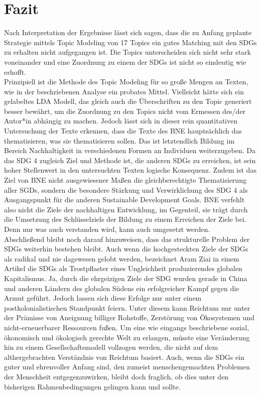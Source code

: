 \documentclass[letterpaper]{article}
\begin{document}
\section{Fazit}
Nach Interpretation der Ergebnisse lässt sich sagen, dass die zu Anfang geplante Strategie mittels Topic Modeling von 17 Topics ein gutes Matching mit den SDGs zu erhalten nicht aufgegangen ist. Die Topics unterscheiden sich nicht sehr stark voneinander und eine Zuordnung zu einem der SDGs ist nicht so eindeutig wie erhofft.\\
Prinzipiell ist die Methode des Topic Modeling für so große Mengen an Texten, wie in der beschriebenen Analyse ein probates Mittel. Vielleicht hätte sich ein gelabeltes LDA Modell, das gleich auch die Überschriften zu den Topic generiert besser bewährt, um die Zuordnung zu den Topics nicht vom Ermessen des/der Autor*in abhängig zu machen. Jedoch lässt sich in dieser rein quantitativen Untersuchung der Texte erkennen, dass die Texte des BNE hauptsächlich das thematisieren, was sie thematisieren sollen. Das ist letztendlich Bildung im Bereich Nachhaltigkeit in verschiedenen Formen an Individuen weiterzugeben. Da das SDG 4 zugleich Ziel und Methode ist, die anderen SDGs zu erreichen, ist sein hoher Stellenwert in den untersuchten Texten logische Konsequenz. Zudem ist das Ziel von BNE nicht ausgewiesener Maßen die gleichberechtigte Thematisierung aller SGDs, sondern die besondere Stärkung und Verwirklichung des SDG 4 als Ausgangspunkt für die anderen Sustainable Development Goals. BNE verfehlt also nicht die Ziele der nachhaltigen Entwicklung, im Gegenteil, sie trägt durch die Umsetzung des Schlüsselziels der Bildung zu einem Erreichen der Ziele bei. Denn nur was auch verstanden wird, kann auch umgesetzt werden.\\
Abschließend bleibt noch darauf hinzuweisen, dass das strukturelle Problem der SDGs weiterhin bestehen bleibt. Auch wenn die hochgesteckten Ziele der SDGs als radikal und nie dagewesen gelobt werden, bezeichnet Aram Ziai in einem Artikel die SDGs als \glqq Trostpflaster eines Ungleichheit produzierendes globalen Kapitalismus\grqq{}. Ja, durch die ehrgeizigen Ziele der SDG wurden gerade in China und anderen Ländern des globalen Südens ein erfolgreicher Kampf gegen die Armut geführt. Jedoch lassen sich diese Erfolge nur unter einem postkolonialistischen Standpunkt feiern. Unter diesem kann Reichtum nur unter der Prämisse von Aneignung billiger Rohstoffe, Zerstörung von Ökosystemen und nicht-erneuerbarer Ressourcen fußen. Um eine wie eingangs beschriebene sozial, ökonomisch und ökologisch gerechte Welt zu erlangen, müsste eine Veränderung hin zu einem Gesellschaftsmodell vollzogen werden, die nicht auf dem althergebrachten Verständnis von Reichtum basiert\cite{Ziai}. Auch, wenn die SDGs ein guter und ehrenvoller Anfang sind, den zumeist menschengemachten Problemen der Menschheit entgegenzuwirken, bleibt doch fraglich, ob dies unter den bisherigen Rahmenbedingungen gelingen kann und sollte.
\end{document}
